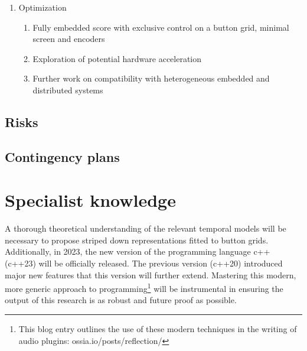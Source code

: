 \documentclass[journal,onecolumn]{IEEEtran}
\begin{document}
\begin{enumerate}
\begin{enumerate}
        \item States, events, intervals and transition creation, manipulation, deletion, copy and paste
        \item Process and device display and manipulation
        \item Trigger and condition manipulation (with logical expressions)
        \item Empress Zoya\footnote{empresseffects.com/products/zoia} style patching
    \end{enumerate}
    \item Optimization
    \begin{enumerate}
        \item Fully embedded score with exclusive control on a button grid, minimal screen and encoders
        \item Exploration of potential hardware acceleration
        \item Further work on compatibility with heterogeneous embedded and distributed systems
    \end{enumerate}
\end{enumerate}

\subsection{Risks}
\subsection{Contingency plans}

\section{Specialist knowledge} %
A thorough theoretical understanding of the relevant temporal models will be necessary to propose striped down representations fitted to button grids. 
Additionally, in 2023, the new version of the programming language c++ (c++23) will be officially released. The previous version (c++20) introduced major new features that this version will further extend. Mastering this modern, more generic approach to programming\footnote{This blog entry outlines  the use of these modern techniques in the writing of audio plugins: ossia.io/posts/reflection/} will be instrumental in ensuring the output of this research is as robust and future proof as possible. 
\end{document}
